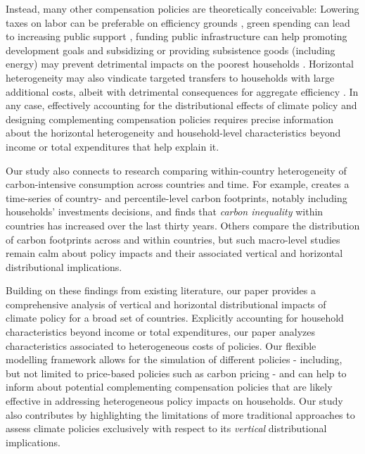 \documentclass[12pt, a4paper]{article}
\begin{document}
Instead, many other compensation policies are theoretically conceivable: Lowering taxes on labor can be preferable on efficiency grounds \autocite{Goulder.1995,Bento.2018}, green spending can lead to increasing public support \autocite{Sommer.2022,Kotchen.2017,Dechezlepretre.2022}, funding public infrastructure can help promoting development goals \autocite{Franks.2018,Jakob.2016} and subsidizing or providing subsistence goods (including energy) may prevent detrimental impacts on the poorest households \autocite{Greve.2022,Schaffitzel.2019}. Horizontal heterogeneity may also vindicate targeted transfers to households with large additional costs, albeit with detrimental consequences for aggregate efficiency \autocite{Hansel.2022}. In any case, effectively accounting for the distributional effects of climate policy and designing complementing compensation policies requires precise information about the horizontal heterogeneity and household-level characteristics beyond income or total expenditures that help explain it. 

Our study also connects to research comparing within-country heterogeneity of carbon-intensive consumption across countries and time. For example, \textcite{Chancel.2022b} creates a time-series of country- and percentile-level carbon footprints, notably including households' investments decisions, and finds that \textit{carbon inequality} within countries has increased over the last thirty years. Others \autocite{Oswald.2020,Bruckner.2022} compare the distribution of carbon footprints across and within countries, but such macro-level studies remain calm about policy impacts and their associated vertical and horizontal distributional implications.

Building on these findings from existing literature, our paper provides a comprehensive analysis of vertical and horizontal distributional impacts of climate policy for a broad set of countries. Explicitly accounting for household characteristics beyond income or total expenditures, our paper analyzes characteristics associated to heterogeneous costs of policies. Our flexible modelling framework allows for the simulation of different policies - including, but not limited to price-based policies such as carbon pricing - and can help to inform about potential complementing compensation policies that are likely effective in addressing heterogeneous policy impacts on households. Our study also contributes by highlighting the limitations of more traditional approaches to assess climate policies exclusively with respect to its \textit{vertical} distributional implications.
\end{document}
